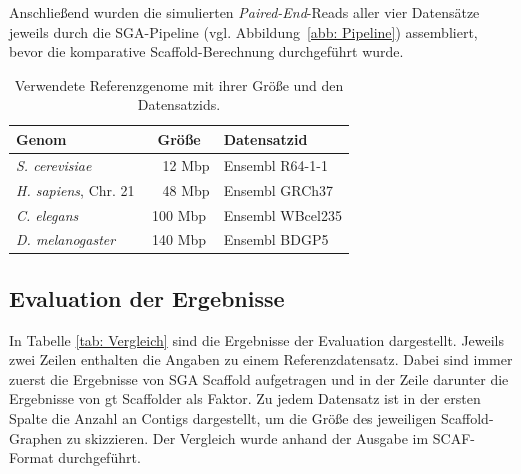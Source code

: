\documentclass[a4paper,10pt,parskip]{scrartcl}
\begin{document}
Anschließend wurden die simulierten \textit{Paired-End}-Reads aller vier
Datensätze jeweils durch die SGA-Pipeline (vgl. Abbildung~\ref{abb: Pipeline})
assembliert, bevor die komparative Scaffold-Berechnung durchgeführt wurde.

\begin{table}
  \centering
  \begin{tabular}{l | c | l}
    Genom & Größe & Datensatzid \\
    \hline
    \textit{S. cerevisiae} &~~12 Mbp & Ensembl R64-1-1 \\
    \textit{H. sapiens}, Chr. 21 &~~48 Mbp & Ensembl GRCh37 \\
    \textit{C. elegans} & 100 Mbp & Ensembl WBcel235 \\
    \textit{D. melanogaster} & 140 Mbp & Ensembl BDGP5
  \end{tabular}
  \caption{\label{tab: Referenzgenome} Verwendete Referenzgenome mit
    ihrer Größe und den Datensatzids.}
\end{table}

\subsection{Evaluation der Ergebnisse}

In Tabelle \ref{tab: Vergleich} sind die Ergebnisse der Evaluation
dargestellt. Jeweils zwei Zeilen enthalten die Angaben zu einem
Referenzdatensatz. Dabei sind immer zuerst die Ergebnisse von SGA
Scaffold aufgetragen und in der Zeile darunter die Ergebnisse von gt
Scaffolder als Faktor. Zu jedem Datensatz ist in der ersten Spalte die
Anzahl an Contigs dargestellt, um die Größe des jeweiligen
Scaffold-Graphen zu skizzieren. Der Vergleich wurde anhand der Ausgabe
im SCAF-Format durchgeführt.
\end{document}
